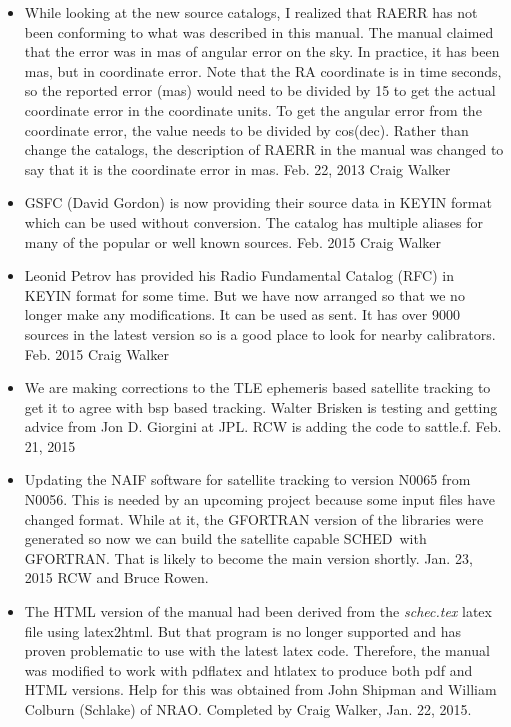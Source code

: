 \documentclass{report}
\newcommand{\schedb}{{\sc SCHED~}}
\begin{document}
\begin{itemize}
\item While looking at the new source catalogs, I realized that RAERR
has not been conforming to what was described in this manual.  The manual
claimed that the error was in mas of angular error on the sky.  In 
practice, it has been mas, but in coordinate error.  Note that the 
RA coordinate is in time seconds, so the reported error (mas) would need
to be divided by 15 to get the actual coordinate error in the coordinate
units.  To get the angular error from the coordinate error, the value
needs to be divided by cos(dec).  Rather than change the catalogs, the
description of RAERR in the manual was changed to say that it is the
coordinate error in mas.  Feb. 22, 2013 Craig Walker

\item GSFC (David Gordon) is now providing their source data in KEYIN
format which can be used without conversion.  The catalog has multiple
aliases for many of the popular or well known sources.  Feb. 2015
Craig Walker

\item Leonid Petrov has provided his Radio Fundamental Catalog (RFC)
in KEYIN format for some time.  But we have now arranged so that we
no longer make any modifications.  It can be used as sent.  It has
over 9000 sources in the latest version so is a good place to look
for nearby calibrators.  Feb. 2015 Craig Walker

\item We are making corrections to the TLE ephemeris based satellite
tracking to get it to agree with bsp based tracking.  Walter Brisken
is testing and getting advice from Jon D. Giorgini at JPL.  RCW is
adding the code to sattle.f.  Feb. 21, 2015

\item Updating the NAIF software for satellite tracking to version
N0065 from N0056.  This is needed by an upcoming project because some
input files have changed format.  While at it, the GFORTRAN version
of the libraries were generated so now we can build the satellite
capable \schedb with GFORTRAN.  That is likely to become the main
version shortly.  Jan. 23, 2015  RCW and Bruce Rowen.

\item The HTML version of the manual had been derived from the {\sl
schec.tex} latex file using latex2html.  But that program is no
longer supported and has proven problematic to use with the latest
latex code.  Therefore, the manual was modified to work with pdflatex
and htlatex to produce both pdf and HTML versions.  Help for this was
obtained from John Shipman and William Colburn (Schlake) of NRAO.
Completed by Craig Walker, Jan. 22, 2015.


\end{itemize}
\end{document}
